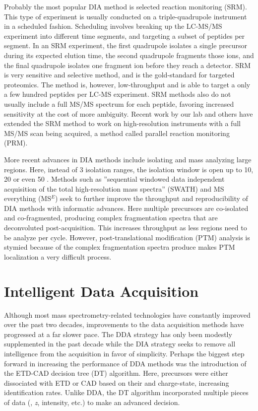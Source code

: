 Probably the most popular DIA method is selected reaction monitoring (SRM).\cite{mrm1,mrm2,mrm3} This type of experiment is usually conducted on a triple-quadrupole instrument in a scheduled fashion. Scheduling involves breaking up the LC-MS/MS experiment into different time segments, and targeting a subset of peptides per segment. In an SRM experiment, the first quadrupole isolates a single precursor during its expected elution time, the second quadrupole fragments those ions, and the final quadrupole isolates one fragment ion before they reach a detector. SRM is very sensitive and selective method, and is the gold-standard for targeted proteomics. The method is, however, low-throughput and is able to target a only a few hundred peptides per LC-MS experiment.\cite{} SRM methods also do not usually include a full MS/MS spectrum for each peptide, favoring increased sensitivity at the cost of more ambiguity. Recent work by our lab and others have extended the SRM method to work on high-resolution instruments with a full MS/MS scan being acquired, a method called parallel reaction monitoring (PRM).\cite{prm1,prm2} 

More recent advances in DIA methods include isolating and mass analyzing large \mz{} regions. Here, instead of 3 \mz{} isolation ranges, the isolation window is open up to 10, 20 or even 50 \mz{}. Methods such as ''sequential windowed data independent acquisition of the total high-resolution mass spectra'' (SWATH) and MS everything (MS$^E$) seek to further improve the throughput and reproducibility of DIA methods with informatic advances.\cite{swath,mse} Here multiple precursors are co-isolated and co-fragmented, producing complex fragmentation spectra that are deconvoluted post-acquisition. This increases throughput as less \mz{} regions need to be analyze per cycle. However, post-translational modification (PTM) analysis is stymied because of the complex fragmentation spectra produce makes PTM localization a very difficult process.

\section{Intelligent Data Acquisition}
Although most mass spectrometry-related technologies have constantly improved over the past two decades, improvements to the data acquisition methods have progressed at a far slower pace. The DDA strategy has only been modestly supplemented in the past decade while the DIA strategy seeks to remove all intelligence from the acquisition in favor of simplicity. Perhaps the biggest step forward in increasing the performance of DDA methods was the introduction of the ETD-CAD decision tree (DT) algorithm.\cite{decisiontree} Here, precursors were either dissociated with ETD or CAD based on their \mz{} and charge-state, increasing identification rates. Unlike DDA, the DT algorithm incorporated multiple pieces of data (\mz{}, \emph{z}, intensity, etc.) to make an advanced decision.

